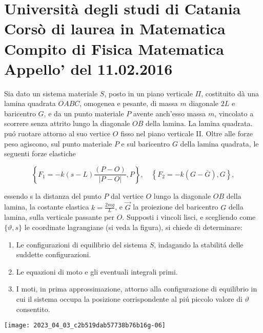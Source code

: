 \documentclass[10pt]{article}
\begin{document}
\section{Università degli studi di Catania
Corsò di laurea in Matematica
Compito di Fisica Matematica
Appello' del 11.02.2016}
Sia dato un sistema materiale \(S\), posto in un piano verticale \(\Pi\), costituito dà una lamina quadrata \(O A B C\), omogenea e pesante, di massa \(m\) diagonale \(2 L\) e baricentro \(G\), e da un punto materiale \(P\) avente anch'esso massa \(m\), vincolato a scorrere senza attrito lungo la diagonale \(O B\) della lamina. La lamina quadrata. puó ruotare attorno al suo vertice \(O\) fisso nel piano verticale II. Oltre alle forze peso agiscono, sul punto materiale \(P\) e sul baricentro \(G\) della lamina quadrata, le seguenti forze elastiche

\[
\left\{F_{1}=-k(s-L) \frac{(P-O)}{|P-O|}, P\right\}, \quad\left\{F_{2}=-k(G-\bar{G}), G\right\},
\]

essendo s la distanza del punto \(P\) dal vertice \(O\) lungo la diagonale \(O B\) della lamina, la costante elastica \(k=\frac{2 m g}{L}\), e \(\vec{G}\) la proiezione del baricentro \(G\) della lamina, sulla verticale passante per \(O\). Supposti i vincoli lisci, e scegliendo come \(\{\vartheta, s\}\) le coordinate lagrangiane (si veda la figura), si chiede di determinare:

\begin{enumerate}
  \item Le configurazioni di equilibrio del sistema \(S\), indagando la stabilitá delle suddette configurazioni.

  \item Le equazioni di moto e gli eventuali integrali primi.

  \item I moti, in prima approssimazione, attorno alla configurazione di equilibrio in cui il sistema occupa la posizione corrispondente al piú piccolo valore di \(\vartheta\) consentito.

\end{enumerate}

\begin{center}
\texttt{[image: 2023\_04\_03\_c2b519dab57738b76b16g-06]}
\end{center}
\end{document}
